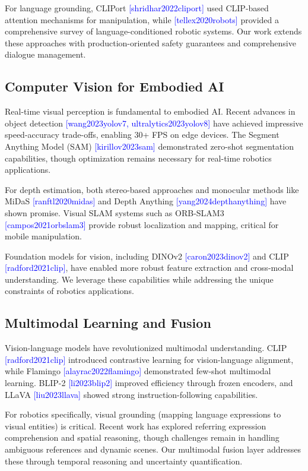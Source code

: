 \documentclass[conference]{IEEEtran}
\newcommand{\cite}[1]{\textcolor{blue}{[#1]}}
\begin{document}
For language grounding, CLIPort \cite{shridhar2022cliport} used CLIP-based attention mechanisms for manipulation, while \cite{tellex2020robots} provided a comprehensive survey of language-conditioned robotic systems. Our work extends these approaches with production-oriented safety guarantees and comprehensive dialogue management.

\subsection{Computer Vision for Embodied AI}

Real-time visual perception is fundamental to embodied AI. Recent advances in object detection \cite{wang2023yolov7, ultralytics2023yolov8} have achieved impressive speed-accuracy trade-offs, enabling 30+ FPS on edge devices. The Segment Anything Model (SAM) \cite{kirillov2023sam} demonstrated zero-shot segmentation capabilities, though optimization remains necessary for real-time robotics applications.

For depth estimation, both stereo-based approaches and monocular methods like MiDaS \cite{ranftl2020midas} and Depth Anything \cite{yang2024depthanything} have shown promise. Visual SLAM systems such as ORB-SLAM3 \cite{campos2021orbslam3} provide robust localization and mapping, critical for mobile manipulation.

Foundation models for vision, including DINOv2 \cite{caron2023dinov2} and CLIP \cite{radford2021clip}, have enabled more robust feature extraction and cross-modal understanding. We leverage these capabilities while addressing the unique constraints of robotics applications.

\subsection{Multimodal Learning and Fusion}

Vision-language models have revolutionized multimodal understanding. CLIP \cite{radford2021clip} introduced contrastive learning for vision-language alignment, while Flamingo \cite{alayrac2022flamingo} demonstrated few-shot multimodal learning. BLIP-2 \cite{li2023blip2} improved efficiency through frozen encoders, and LLaVA \cite{liu2023llava} showed strong instruction-following capabilities.

For robotics specifically, visual grounding (mapping language expressions to visual entities) is critical. Recent work has explored referring expression comprehension and spatial reasoning, though challenges remain in handling ambiguous references and dynamic scenes. Our multimodal fusion layer addresses these through temporal reasoning and uncertainty quantification.
\end{document}
